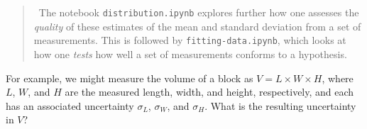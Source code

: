 \begin{quote}
\notebook\ The notebook \texttt{distribution.ipynb} explores further how one assesses the \emph{quality} of these estimates of the mean and standard deviation from a set of measurements. This is followed by \texttt{fitting-data.ipynb}, which looks at how one \emph{tests} how well a set of measurements conforms to a hypothesis.
\end{quote}

  For example, we might measure the volume of a block as $V=L\times W\times H$, where $L$, $W$, and $H$ are the measured length, width, and height, respectively, and each has an associated uncertainty $\sigma_L$, $\sigma_W$, and $\sigma_H$. What is the resulting uncertainty in $V$?

